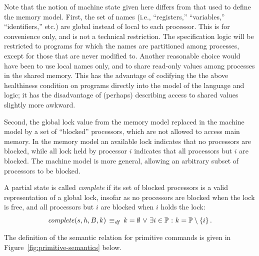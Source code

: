 \documentclass[11pt]{report}
\begin{document}
Note that the notion of machine state given here differs from that used to define the memory model. First, the set of names (i.e., ``registers,'' ``variables,'' ``identifiers,'' etc.) are global instead of local to each processor. This is for convenience only, and is not a technical restriction. The specification logic will be restricted to programs for which the names are partitioned among processes, except for those that are never modified to. Another reasonable choice would have been to use local names only, and to share read-only values among processes in the shared memory. This has the advantage of codifying the the above healthiness condition on programs directly into the model of the language and logic; it has the disadvantage of (perhaps) describing access to shared values slightly more awkward. 

Second, the global lock value from the memory model replaced in the machine model by a set of ``blocked'' processors, which are not allowed to access main memory. In the memory model an available lock indicates that no processors are blocked, while all lock held by processor $i$ indicates that all processors but $i$ are blocked. The machine model is more general, allowing an arbitrary subset of processors to be blocked. 

A partial state is called \emph{complete} if its set of blocked processors is a valid representation of a global lock, insofar as no processors are blocked when the lock is free, and all processors but $i$ are blocked when $i$ holds the lock: \[ \mathit{complete}(s,h,B,k) \operatorname{\;\equiv_{\mathit{df}}\;} k = \operatorname{\emptyset} \operatorname{\,\vee\,} \exists i \in \mathbb{P} \operatorname{\,:\,} k = \mathbb{P} \setminus \left\lbrace i \right\rbrace.\]

The definition of the semantic relation for primitive commands is given in Figure~\ref{fig:primitive-semantics} below. 
\end{document}
